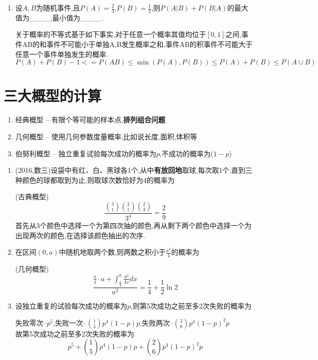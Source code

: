 \documentclass[12pt, a4paper, oneside, UTF8]{ctexbook}
\begin{document}
\begin{enumerate}[label=\arabic*.]
    \item 设$A,B$为随机事件,且$P(A)=\frac{2}{3}$,$P(B)=\frac{1}{2}$,则$P(A|B)+P(B|A)$的最大值为\_\_\_\_,最小值为\_\_\_\_.
    
    \begin{solution}
    关于概率的不等式基于如下事实,对于任意一个概率其值均位于$[0,1]$之间,事件AB的和事件不可能小于单独A,B发生概率之和,事件AB的积事件不可能大于
    任意一个事件单独发生的概率.
    \[
    P(A)+P(B) - 1<=P(AB) \leq \min{(P(A),P(B))}  \leq P(A) + P(B) \leq P(A\cup B) 
    \]
    \end{solution}
\end{enumerate}

\section{三大概型的计算}
\begin{remark}[三大概率模型]
    \begin{enumerate}
    \item 经典概型 -- 有限个等可能的样本点,\textbf{排列组合问题}
    \item 几何概型 -- 使用几何参数度量概率,比如说长度,面积,体积等
    \item 伯努利概型 -- 独立重复试验每次成功的概率为$p$,不成功的概率为($1-p$)
    \end{enumerate}
\end{remark}
\begin{enumerate}[label=\arabic*.,start=6]
    \item (2016,数三)设袋中有红、白、黑球各1个,从中\textbf{有放回地}取球,每次取1个,直到三种颜色的球都取到为止,则取球次数恰好为4的概率为
    
    \begin{solution}
    (古典概型) 
    \[\frac{\binom{3}{1}\binom{2}{1}\binom{2}{3}}{3^4}=\frac{2}{9}\]
    首先从3个颜色中选择一个为第四次抽的颜色,再从剩下两个颜色中选择一个为出现两次的颜色,在选择该颜色抽出的次序.
    \end{solution}
    \item 在区间$(0,a)$中随机地取两个数,则两数之积小于$\frac{a^2}{4}$的概率为
    
    \begin{solution}
    (几何概型)
    \[
    \frac{\frac{a}{4}\cdot a + \int_{\frac{a}{4}}^{a}\frac{a^2}{4x}dx}{a^2} = \frac{1}{4} + \frac{1}{2}\ln{2}
    \]
    \end{solution}
    \item 设独立重复的试验每次成功的概率为$p$,则第5次成功之前至多2次失败的概率为
    
    \begin{solution}
    失败零次--$p^5$,失败一次--$\binom{1}{5}p^4(1-p)p$,失败两次--$\binom{2}{6}p^4(1-p)^2p$ \\
    故第5次成功之前至多2次失败的概率为
    \[
    p^5 + \binom{1}{5}p^4(1-p)p + \binom{2}{6}p^4(1-p)^2p
    \]
    \end{solution}
\end{enumerate}
\end{document}
